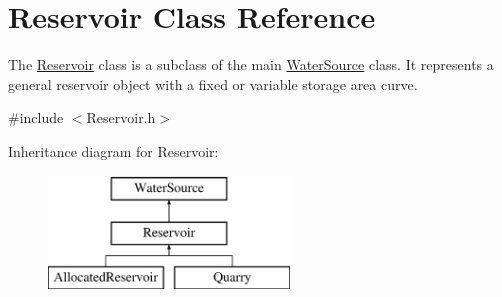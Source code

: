 \hypertarget{classReservoir}{}\section{Reservoir Class Reference}
\label{classReservoir}


The {\ttfamily \mbox{\hyperlink{classReservoir}{Reservoir}}} class is a subclass of the main {\ttfamily \mbox{\hyperlink{classWaterSource}{Water\+Source}}} class. It represents a general reservoir object with a fixed or variable storage area curve.  




{\ttfamily \#include $<$Reservoir.\+h$>$}

Inheritance diagram for Reservoir\+:\begin{figure}[H]
\begin{center}
\leavevmode
\includegraphics[height=3.000000cm]{classReservoir}
\end{center}
\end{figure}
